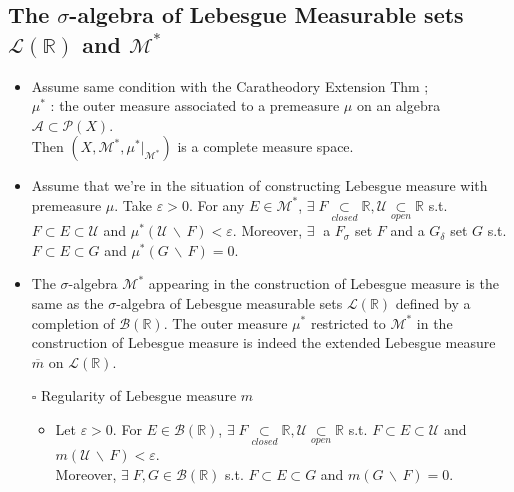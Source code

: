 \documentclass[12pt]{article}
\newcommand{\sq}{$\square$}
\newcommand{\R}{\mathbb{R}}
\newcommand{\U}{\mathcal{U}}
\newcommand{\A}{\mathcal{A}}
\newcommand{\LL}{\mathcal{L}}
\newcommand{\Borel}{\mathcal{B}(\mathbb{R})}
\newcommand{\open}{\underset{open}{\subset}}
\newcommand{\closed}{\underset{closed}{\subset}}
\newcommand{\diff}{\, \backslash \,}
\newcommand{\exist}{\exists \;}
\begin{document}
\subsection{The $\sigma$-algebra of Lebesgue Measurable sets $\LL(\R)$ and $\mathcal{M}^*$}
\smallskip
\begin{itemize}
    \item Assume same condition with the Caratheodory Extension Thm  ; \\ $\mu^*$ : the outer measure associated to a premeasure $\mu$ on an algebra $\A\subset \mathcal{P}(X)$. \\ Then $(X, \mathcal{M}^*, \mu^*|_{\mathcal{M}^*})$ is a complete measure space.
    \item Assume that we're in the situation of constructing Lebesgue measure with premeasure $\mu$. Take $\varepsilon>0$. For any $E\in \mathcal{M}^*$, $\exist F\closed \R, \U\open \R$ s.t. $F\subset E\subset \U$ and $\mu^*(\U\diff F)<\varepsilon$. Moreover, $\exist$ a $F_\sigma$ set $F$ and a $G_\delta$ set $G$ s.t. $F\subset E\subset G$ and $\mu^*(G\diff F)=0$. 
    \item The $\sigma$-algebra $\mathcal{M}^*$ appearing in the construction of Lebesgue measure is the same as the $\sigma$-algebra of Lebesgue measurable sets $\LL(\R)$ defined by a completion of $\Borel$. The outer measure $\mu^*$ restricted to $\mathcal{M}^*$ in the construction of Lebesgue measure is indeed the extended Lebesgue measure $\overline{m}$ on $\LL(\R)$.
    \item [\sq] Regularity of Lebesgue measure $m$
    \begin{itemize}
        \item Let $\varepsilon>0$. For $E\in \Borel$, $\exist F\closed \R, \U\open \R$ s.t. $F\subset E\subset \U$ and $m(\U\diff F)<\varepsilon$. \\ Moreover, $\exist F, G\in \Borel$ s.t. $F\subset E\subset G$ and $m(G\diff F)=0$.
    \end{itemize} 
\end{itemize}
\smallskip
\end{document}
